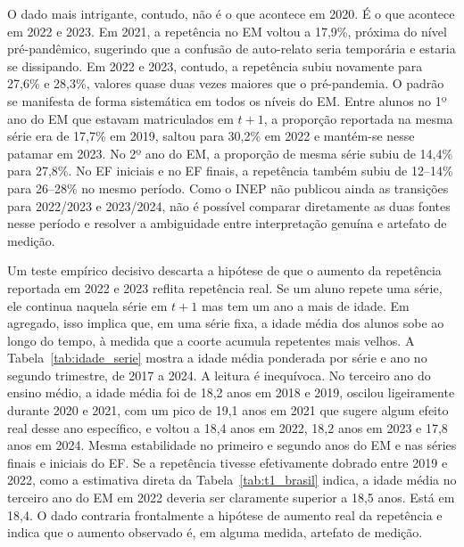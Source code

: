 O dado mais intrigante, contudo, não é o que acontece em 2020.
É o que acontece em 2022 e 2023. Em 2021, a repetência no EM
voltou a 17,9\%, próxima do nível pré-pandêmico, sugerindo que
a confusão de auto-relato seria temporária e estaria se
dissipando. Em 2022 e 2023, contudo, a repetência subiu
novamente para 27,6\% e 28,3\%, valores quase duas vezes
maiores que o pré-pandemia. O padrão se manifesta de forma
sistemática em todos os níveis do EM. Entre alunos no 1º ano
do EM que estavam matriculados em $t+1$, a proporção
reportada na mesma série era de 17,7\% em 2019, saltou para
30,2\% em 2022 e mantém-se nesse patamar em 2023. No 2º ano
do EM, a proporção de mesma série subiu de 14,4\% para 27,8\%.
No EF iniciais e no EF finais, a repetência também subiu de
12--14\% para 26--28\% no mesmo período. Como o INEP não
publicou ainda as transições para 2022/2023 e 2023/2024, não
é possível comparar diretamente as duas fontes nesse período
e resolver a ambiguidade entre interpretação genuína e
artefato de medição.

Um teste empírico decisivo descarta a hipótese de que o
aumento da repetência reportada em 2022 e 2023 reflita
repetência real. Se um aluno repete uma série, ele continua
naquela série em $t+1$ mas tem um ano a mais de idade. Em
agregado, isso implica que, em uma série fixa, a idade média
dos alunos sobe ao longo do tempo, à medida que a coorte
acumula repetentes mais velhos. A Tabela~\ref{tab:idade_serie}
mostra a idade média ponderada por série e ano no segundo
trimestre, de 2017 a 2024. A leitura é inequívoca. No
terceiro ano do ensino médio, a idade média foi de 18,2 anos
em 2018 e 2019, oscilou ligeiramente durante 2020 e 2021, com
um pico de 19,1 anos em 2021 que sugere algum efeito real
desse ano específico, e voltou a 18,4 anos em 2022, 18,2
anos em 2023 e 17,8 anos em 2024. Mesma estabilidade no
primeiro e segundo anos do EM e nas séries finais e iniciais
do EF. Se a repetência tivesse efetivamente dobrado entre
2019 e 2022, como a estimativa direta da Tabela~\ref{tab:t1_brasil}
indica, a idade média no terceiro ano do EM em 2022 deveria
ser claramente superior a 18,5 anos. Está em 18,4. O dado
contraria frontalmente a hipótese de aumento real da
repetência e indica que o aumento observado é, em alguma
medida, artefato de medição.



